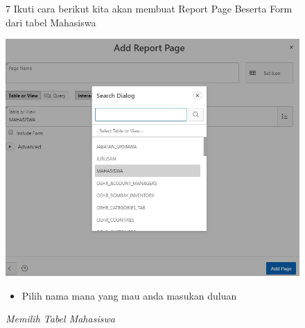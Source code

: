 \begin{itemize}
        \begin{figure}[!htbp]
        \item[7]Ikuti cara berikut kita akan membuat Report Page Beserta Form dari tabel Mahasiswa
        \begin{center}
        \includegraphics[scale=0.5]{figures/ambil_database_mahasiswa.jpg}
        \caption{\textit{Memilih Tabel Mahasiswa}}
        \end{center}
        \begin{itemize}
            \item Pilih nama mana yang mau anda masukan duluan 
        \end{itemize}
        \end{figure}
        

\end{itemize}
